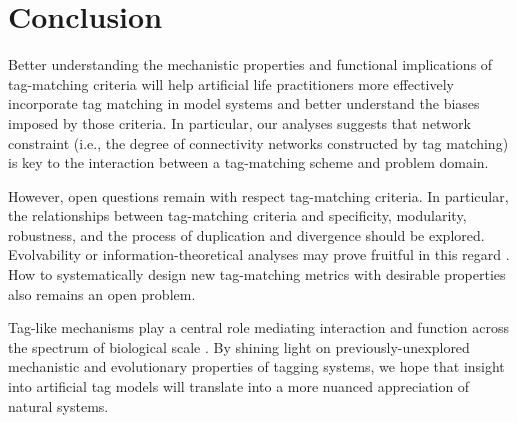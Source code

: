 \section{Conclusion}

Better understanding the mechanistic properties and functional implications of tag-matching criteria will help artificial life practitioners more effectively incorporate tag matching in model systems and better understand the biases imposed by those criteria.
In particular, our analyses suggests that network constraint (i.e., the degree of connectivity networks constructed by tag matching) is key to the interaction between a tag-matching scheme and problem domain.

However, open questions remain with respect tag-matching criteria.
In particular, the relationships between tag-matching criteria and specificity, modularity, robustness, and the process of duplication and divergence should be explored. 
Evolvability or information-theoretical analyses may prove fruitful in this regard \citep{tarapore2015evolvability}.
How to 
systematically design new tag-matching metrics with desirable properties also remains an open problem.

Tag-like mechanisms play a central role mediating interaction and function across the spectrum of biological scale \citep{holland2012signals}.
By shining light on previously-unexplored mechanistic and evolutionary properties of tagging systems, we hope that insight into artificial tag models will translate into a more nuanced appreciation of natural systems.
